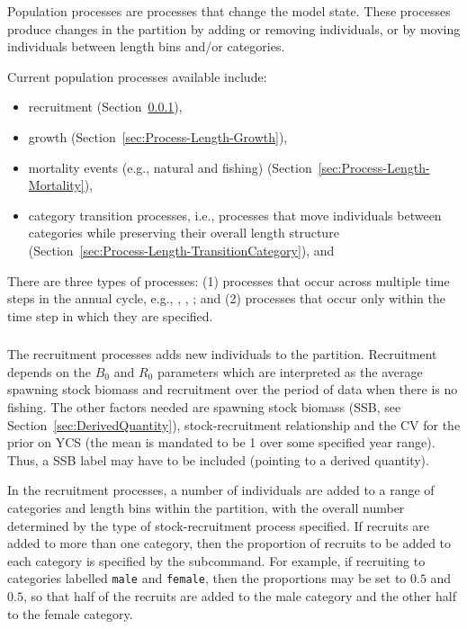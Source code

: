 
Population processes are processes that change the model state. These processes produce changes in the partition by adding or removing individuals, or by moving individuals between length bins and/or categories.

Current population processes available include:

\begin{itemize}
\item recruitment (Section~\ref{sec:Process-Length-Recruitment}),
\item growth (Section~\ref{sec:Process-Length-Growth}),
\item mortality events (e.g., natural and fishing) (Section~\ref{sec:Process-Length-Mortality}), 
\item category transition processes, i.e., processes that move individuals between categories while preserving their overall length structure (Section~\ref{sec:Process-Length-TransitionCategory}), and
\end{itemize}

There are three types of processes: (1) processes that occur across multiple time steps in the annual cycle, e.g., , , ; and (2) processes that occur only within the time step in which they are specified.

\subsubsection{}\label{sec:Process-Length-Recruitment}

The recruitment processes adds new individuals to the partition. Recruitment depends on the \(B_{0}\) and \(R_{0}\) parameters which are interpreted as the average spawning stock biomass and recruitment over the period of data when there is no fishing. The other factors needed are spawning stock biomass (SSB, see Section~\ref{sec:DerivedQuantity}), stock-recruitment relationship and the CV for the prior on YCS (the mean is mandated to be 1 over some specified year range). Thus, a SSB label may have to be included (pointing to a derived quantity).

In the recruitment processes, a number of individuals are added to a range of categories and length bins within the partition, with the overall number determined by the type of stock-recruitment process specified. If recruits are added to more than one category, then the proportion of recruits to be added to each category is specified by the  subcommand. For example, if recruiting to categories labelled \texttt{male} and \texttt{female}, then the proportions may be set to $0.5$ and $0.5$, so that half of the recruits are added to the male category and the other half to the female category.

